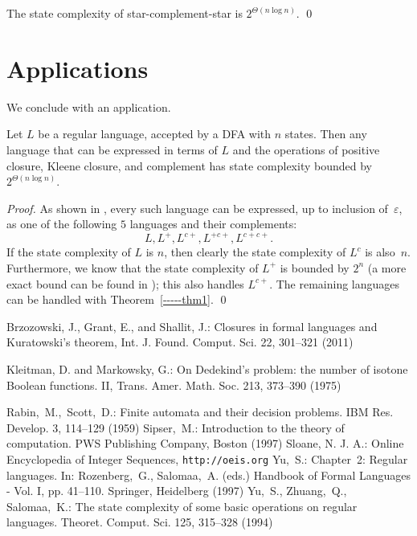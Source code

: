 \documentclass[runningheads]{llncs}
\renewcommand{\epsilon}{\varepsilon}
\begin{document}
\begin{theorem}\label{-----thm1}
 The state complexity of star-complement-star is $2^{\Theta(n \log n)}$.
\qed
\end{theorem}

\section{Applications}
\label{***applications}

We conclude with an application.

\begin{corollary}
Let $L$ be a regular language, accepted by a DFA with $n$ states.  Then
any language that can be expressed in terms of $L$ and the operations
of positive closure, Kleene closure, and complement has state complexity
bounded by $2^{\Theta(n \log n)}$.
\end{corollary}

\begin{proof}
As shown in \cite{BGS}, every such language
can be expressed, up to inclusion of~$\epsilon$,
as one of the following $5$ languages and their complements:
$$L, L^{+}, L^{c+}, L^{+c+}, L^{c+c+}.$$
If the state complexity of $L$ is $n$, then
clearly the state complexity of $L^c$ is also~$n$.  Furthermore,
we know that the state complexity of $L^+$ is bounded by
$2^n$ (a more exact bound can be found in \cite{yzs94}); this
also handles $L^{c+}$.
The remaining languages can be handled with Theorem~\ref{-----thm1}.
\qed
\end{proof}


\begin{thebibliography}{00}
\label{***biblio}

 Brzozowski, J., Grant, E., and Shallit, J.:  
Closures in formal languages and Kuratowski's theorem,
Int. J. Found. Comput. Sci. 22, 301--321 (2011)

 Kleitman, D. and Markowsky, G.:
On Dedekind's problem: the number of isotone Boolean functions. II,
Trans. Amer. Math. Soc. 213, 373--390 (1975)

 \mbox{Rabin, M.,  Scott, D.:}
    Finite automata and their decision problems.
    IBM Res. Develop. 3,  114--129 (1959)
 \mbox{Sipser, M.:}
    Introduction to the theory of computation.
    PWS Publishing Company, Boston (1997)
 Sloane, N. J. A.:
	Online Encyclopedia of Integer Sequences,
	{\tt http://oeis.org}
 \mbox{Yu, S.:}
    Chapter~2: Regular languages.
    In: \mbox{Rozenberg, G.,} \mbox{Salomaa, A.} (eds.)
    Handbook of Formal Languages - Vol. I, pp. 41--110.
    Springer,  Heidelberg (1997)  
 \mbox{Yu, S.,} \mbox{Zhuang, Q.,}   \mbox{Salomaa, K.:}
    The state complexity of some basic operations on regular languages.
    Theoret. Comput. Sci. 125, 315--328 (1994)

\end{thebibliography}
\end{document}
